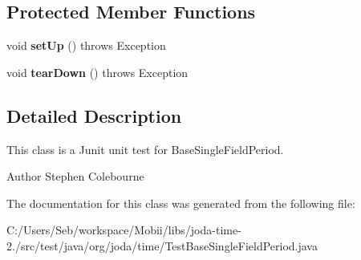 \subsection*{Protected Member Functions}
\begin{DoxyCompactItemize}
\item 
\hypertarget{classorg_1_1joda_1_1time_1_1_test_base_single_field_period_abdc21babea2d1a11a986c6d94b0897fa}{void {\bfseries set\-Up} ()  throws Exception }\label{classorg_1_1joda_1_1time_1_1_test_base_single_field_period_abdc21babea2d1a11a986c6d94b0897fa}

\item 
\hypertarget{classorg_1_1joda_1_1time_1_1_test_base_single_field_period_ac71deb2b44080cfaf791464c820fcff3}{void {\bfseries tear\-Down} ()  throws Exception }\label{classorg_1_1joda_1_1time_1_1_test_base_single_field_period_ac71deb2b44080cfaf791464c820fcff3}

\end{DoxyCompactItemize}


\subsection{Detailed Description}
This class is a Junit unit test for Base\-Single\-Field\-Period.

\begin{DoxyAuthor}{Author}
Stephen Colebourne 
\end{DoxyAuthor}


The documentation for this class was generated from the following file\-:\begin{DoxyCompactItemize}
\item 
C\-:/\-Users/\-Seb/workspace/\-Mobii/libs/joda-\/time-\/2./src/test/java/org/joda/time/Test\-Base\-Single\-Field\-Period.\-java\end{DoxyCompactItemize}
